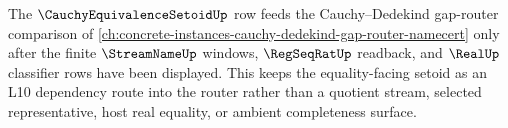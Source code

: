 The $\CauchyEquivalenceSetoidUp$ row feeds the Cauchy--Dedekind gap-router comparison of \autoref{ch:concrete-instances-cauchy-dedekind-gap-router-namecert} only after the finite $\StreamNameUp$ windows, $\RegSeqRatUp$ readback, and $\RealUp$ classifier rows have been displayed. This keeps the equality-facing setoid as an L10 dependency route into the router rather than a quotient stream, selected representative, host real equality, or ambient completeness surface.
